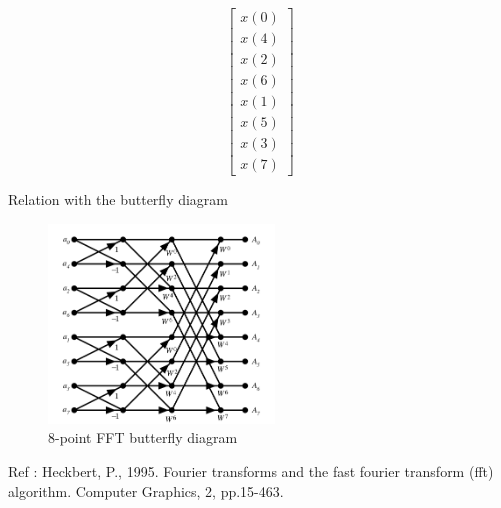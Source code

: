 \documentclass[notheorems]{beamer}
\begin{document}
\begin{frame}
\begin{equation}
{\begin{bmatrix}
x(0) \\ x(4) \\ x(2) \\ x(6) \\ x(1) \\ x(5) \\x(3) \\x(7)
\end{bmatrix}

}
\end{equation}

\end{frame}


\begin{frame}{Relation with the butterfly diagram}
 \begin{figure}[!ht]
	\includegraphics[width=6cm]{figs/butterfly.png}
	\caption{8-point FFT butterfly diagram}
\end{figure}

Ref : Heckbert, P., 1995. Fourier transforms and the fast fourier transform (fft) algorithm. Computer Graphics, 2, pp.15-463.
\end{frame}
\end{document}
